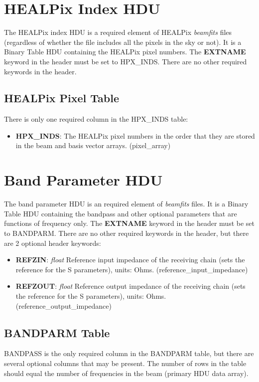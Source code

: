 \documentclass[11pt, oneside]{article}   	%
\begin{document}
\section{HEALPix Index HDU}
The HEALPix index HDU is a required element of HEALPix \textit{beamfits} files (regardless of whether the file includes all the pixels in the sky or not). It is a Binary Table HDU containing the HEALPix pixel numbers.
The \textbf{EXTNAME} keyword in the header must be set to HPX\_INDS. There are no other required keywords in the header.

\subsection{HEALPix Pixel Table}
There is only one required column in the HPX\_INDS table:

\begin{itemize}
\item{\textbf{HPX\_INDS}: The HEALPix pixel numbers in the order that they are stored in the beam and basis vector arrays. (pixel\_array)}
\end{itemize}

\section{Band Parameter HDU}
The band parameter HDU is an required element of \textit{beamfits} files. It is a Binary Table HDU containing the bandpass and other optional parameters that are functions of frequency only.
The \textbf{EXTNAME} keyword in the header must be set to BANDPARM. There are no other required keywords in the header, but there are 2 optional header keywords:

\begin{itemize}
\item{\textbf{REFZIN}: \textit{float} Reference input impedance of the receiving chain (sets the reference for the S parameters), units: Ohms. (reference\_input\_impedance)}
\item{\textbf{REFZOUT}: \textit{float} Reference output impedance of the receiving chain (sets the reference for the S parameters), units: Ohms. (reference\_output\_impedance)}
\end{itemize}

\subsection{BANDPARM Table}
BANDPASS is the only required column in the BANDPARM table, but there are several optional columns that may be present. The number of rows in the table should equal the number of frequencies in the beam (primary HDU data array).
\end{document}
